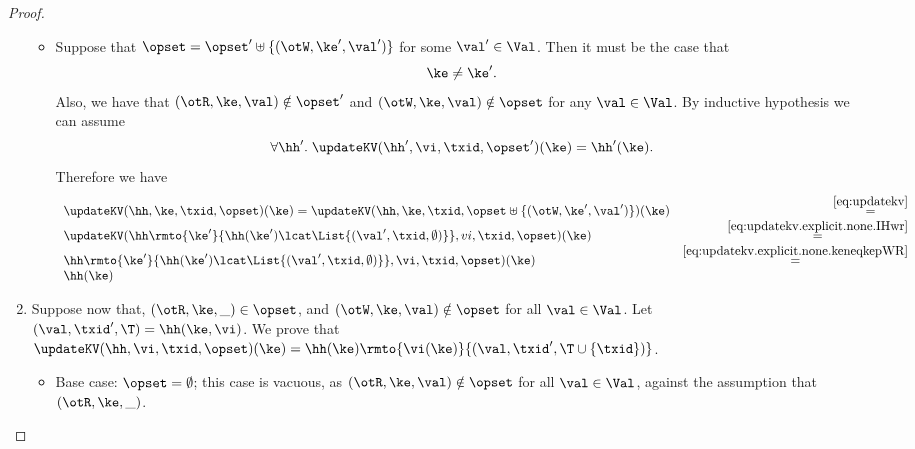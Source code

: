 \begin{proof}
\begin{enumerate}
\begin{itemize}
		\item Suppose that $\opset = \opset' \uplus \{(\otW, \ke', \val')\}$ for some $\val' \in \Val$. Then it must be the 
		case that 
		\begin{equation}
		\label{eq:updatekv.explicit.none.keneqkepWR}
		\ke \neq \ke'.
		\end{equation}
		Also, we have that $(\otR,\ke, \val) \notin \opset'$ and $(\otW, \ke, \val) \notin \opset$ for any $\val \in \Val$. 
		By inductive hypothesis we can assume 
		\begin{equation}
		\forall \hh'.\;\updateKV(\hh', \vi, \txid, \opset')(\ke) = \hh'(\ke).
		\label{eq:updatekv.explicit.none.IHwr}
		\end{equation}
		Therefore we have 
		\[
		\begin{array}{lr}
		\updateKV(\hh, \ke, \txid, \opset)(\ke) = \updateKV(\hh, \ke, \txid, \opset \uplus \{(\otW, \ke', \val')\})(\ke) &\stackrel{\eqref{eq:updatekv}}{=}\\
		\updateKV(\hh\rmto{\ke'}{\hh(\ke')\lcat \List{(\val', \txid, \emptyset)}}, vi, \txid,\opset)(\ke) &\stackrel{\eqref{eq:updatekv.explicit.none.IHwr}}{=}\\
		\hh\rmto{\ke'}{\hh(\ke') \lcat \List{(\val', \txid, \emptyset)}}, \vi, \txid, \opset)(\ke) & \stackrel{\eqref{eq:updatekv.explicit.none.keneqkepWR}}{=}\\
		\hh(\ke)
		\end{array}
		\]
	\end{itemize}

	\item Suppose now that, $(\otR, \ke, \_) \in \opset$, and $(\otW, \ke, \val) \notin \opset$ for all $\val \in \Val$. 
	Let $(\val, \txid', \T) = \hh(\ke, \vi)$. We prove that $\updateKV(\hh, \vi, \txid, \opset)(\ke) = 
	\hh(\ke)\rmto{\vi(\ke)}{(\val, \txid', \T \cup \{\txid\})}$.
		\begin{itemize}
		\item Base case: $\opset = \emptyset$; this case is vacuous, as $(\otR, \ke, \val) \notin \opset$ for all $\val \in \Val$, 
		against the assumption that $(\otR, \ke, \_)$. 


\end{itemize}
\end{enumerate}
\end{proof}
